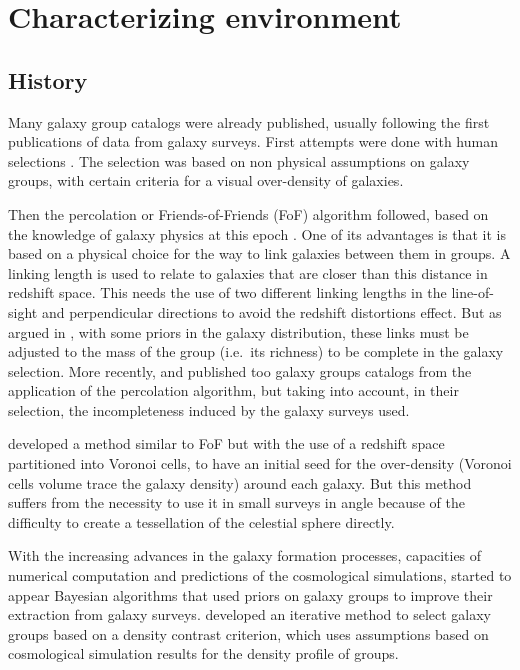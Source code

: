 \section{Characterizing environment}
\label{sec:characterizing_environment}

\subsection{History}
\label{sub:history}

Many galaxy group catalogs were already published, usually following the first
publications of data from galaxy surveys. First attempts were done with human
selections \citep{Abell+58,Zwicky+61,Rose+76}. The selection was based on non
physical assumptions on galaxy groups, with certain criteria for a visual
over-density of galaxies.

Then the percolation or Friends-of-Friends (FoF) algorithm followed, based on
the knowledge of galaxy physics at this epoch \citep{Huchra+82,Nolthenius+87}.
One of its advantages is that it is based on a physical choice for the way to
link galaxies between them in groups. A linking length is used to relate to
galaxies that are closer than this distance in redshift space. This needs the
use of two different linking lengths in the line-of-sight and perpendicular
directions to avoid the redshift distortions effect. But as argued in
\citet{Duarte+14}, with some priors in the galaxy distribution, these links must
be adjusted to the mass of the group (i.e.\ its richness) to be complete in the
galaxy selection. More recently, \citet{Eke+04} and \citet{Berlind+06}
published too galaxy groups catalogs from the application of the percolation
algorithm, but taking into account, in their selection, the incompleteness
induced by the galaxy surveys used.

\citet{Marinoni+02} developed a method similar to FoF but with the use of a
redshift space partitioned into Voronoi cells, to have an initial seed for the
over-density (Voronoi cells volume trace the galaxy density) around each
galaxy. But this method suffers from the necessity to use it in small surveys
in angle because of the difficulty to create a tessellation of the celestial
sphere directly.

With the increasing advances in the galaxy formation processes, capacities of
numerical computation and predictions of the cosmological simulations, started
to appear Bayesian algorithms that used priors on galaxy groups to improve
their extraction from galaxy surveys. \citet{Yang+05,Yang+07} developed an
iterative method to select galaxy groups based on a density contrast criterion,
which uses assumptions based on cosmological simulation results for the density
profile of groups.

